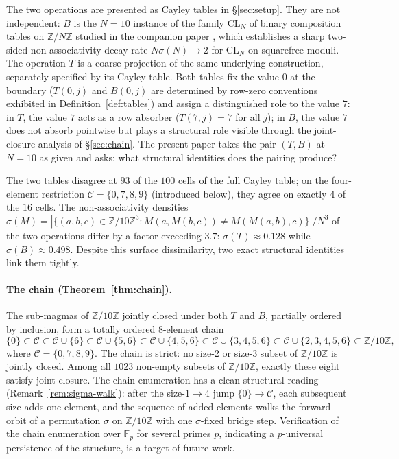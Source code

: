 \documentclass[11pt,reqno]{amsart}
\theoremstyle{plain}
\theoremstyle{definition}
\theoremstyle{remark}
\newcommand{\Z}{\mathbb{Z}}
\newcommand{\Zten}{\Z/10\Z}
\newcommand{\Cfour}{\mathcal{C}}
\newcommand{\CL}{\mathrm{CL}}
\newcommand{\F}{\mathbb{F}}
\begin{document}
The two operations are presented as Cayley tables in
\S\ref{sec:setup}. They are not independent: $B$ is the $N=10$
instance of the family $\CL_{N}$ of binary composition tables on
$\Z/N\Z$ studied in the companion paper
\cite{SandersGish2026Sigma}, which establishes a sharp two-sided
non-associativity decay rate $N\sigma(N)\to 2$ for $\CL_{N}$ on
squarefree moduli. The operation $T$ is a coarse projection of
the same underlying construction, separately specified by its
Cayley table. Both tables fix the value $0$ at the boundary
($T(0,j)$ and $B(0,j)$ are determined by row-zero conventions
exhibited in Definition~\ref{def:tables}) and assign a
distinguished role to the value $7$: in $T$, the value $7$ acts
as a row absorber ($T(7,j)=7$ for all $j$); in $B$, the value
$7$ does not absorb pointwise but plays a structural role visible
through the joint-closure analysis of \S\ref{sec:chain}. The
present paper takes the pair $(T,B)$ at $N=10$ as given and asks:
what structural identities does the pairing produce?

The two tables disagree at $93$ of the $100$ cells of the full
Cayley table; on the four-element restriction $\Cfour=\{0,7,8,9\}$
(introduced below), they agree on exactly $4$ of the $16$ cells.
The non-associativity densities
$\sigma(M)=|\{(a,b,c)\in\Zten^{3}:M(a,M(b,c))\neq M(M(a,b),c)\}|/N^{3}$
of the two operations differ by a factor exceeding $3.7$:
$\sigma(T)\approx 0.128$ while $\sigma(B)\approx 0.498$. Despite
this surface dissimilarity, two exact structural identities link
them tightly.

\paragraph{The chain (Theorem~\ref{thm:chain}).} The sub-magmas
of $\Zten$ jointly closed under both $T$ and $B$, partially
ordered by inclusion, form a totally ordered $8$-element chain
\[
\{0\}\subset\Cfour\subset\Cfour\cup\{6\}\subset\Cfour\cup\{5,6\}\subset
\Cfour\cup\{4,5,6\}\subset\Cfour\cup\{3,4,5,6\}\subset
\Cfour\cup\{2,3,4,5,6\}\subset\Zten,
\]
where $\Cfour=\{0,7,8,9\}$. The chain is strict: no size-$2$ or
size-$3$ subset of $\Zten$ is jointly closed. Among all $1023$
non-empty subsets of $\Zten$, exactly these eight satisfy joint
closure. The chain enumeration has a clean structural reading
(Remark~\ref{rem:sigma-walk}): after the size-$1\to 4$ jump
$\{0\}\to\Cfour$, each subsequent size adds one element, and the
sequence of added elements walks the forward orbit of a
permutation $\sigma$ on $\Zten$ with one $\sigma$-fixed bridge
step. Verification of the chain enumeration over $\F_p$ for
several primes $p$, indicating a $p$-universal persistence of the
structure, is a target of future work.
\end{document}
